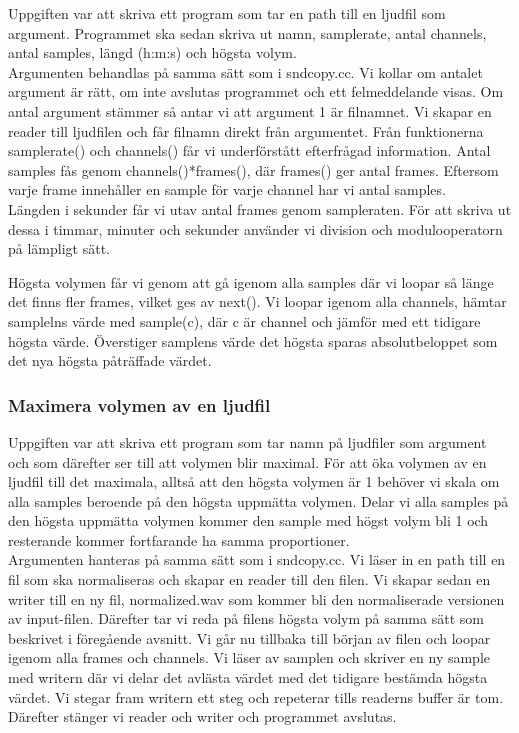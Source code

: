 \documentclass[a4paper, 11pt]{article}
\begin{document}
Uppgiften var att skriva ett program som tar en path till en ljudfil som argument. Programmet ska sedan skriva ut namn, samplerate, antal channels, antal samples, längd (h:m:s) och högsta volym.
\\[\baselineskip]
Argumenten behandlas på samma sätt som i sndcopy.cc. Vi kollar om antalet argument är rätt, om inte avslutas programmet och ett felmeddelande visas. Om antal argument stämmer så antar vi att argument 1 är filnamnet. Vi skapar en reader till ljudfilen och får filnamn direkt från argumentet. Från funktionerna samplerate() och channels() får vi underförstått efterfrågad information. Antal samples fås genom channels()*frames(), där frames() ger antal frames.  Eftersom varje frame innehåller en sample för varje channel har vi antal samples.
\\[\baselineskip]
Längden i sekunder får vi utav antal frames genom sampleraten. För att skriva ut dessa i timmar, minuter och sekunder använder vi division och modulooperatorn på lämpligt sätt.

Högsta volymen får vi genom att gå igenom alla samples där vi loopar så länge det finns fler frames, vilket ges av next(). Vi loopar igenom alla channels, hämtar samplelns värde med sample(c), där c är channel och jämför med ett tidigare högsta värde. Överstiger samplens värde det högsta sparas absolutbeloppet som det nya högsta påträffade värdet.

\subsubsection{Maximera volymen av en ljudfil}

Uppgiften var att skriva ett program som tar namn på ljudfiler som argument och som därefter ser till att volymen blir maximal. För att öka volymen av en ljudfil till det maximala, alltså att den högsta volymen är 1 behöver vi skala om alla samples beroende på den högsta uppmätta volymen. Delar vi alla samples på den högsta uppmätta volymen kommer den sample med högst volym bli 1 och resterande kommer fortfarande ha samma proportioner.
\\[\baselineskip]
Argumenten hanteras på samma sätt som i sndcopy.cc. Vi läser in en path till en fil som ska normaliseras och skapar en reader till den filen. Vi skapar sedan en writer till en ny fil, normalized.wav som kommer bli den normaliserade versionen av input-filen. Därefter tar vi reda på filens högsta volym på samma sätt som beskrivet i föregående avsnitt. Vi går nu tillbaka till början av filen och loopar igenom alla frames och channels. Vi läser av samplen och skriver en ny sample med writern där vi delar det avlästa värdet med det tidigare bestämda högsta värdet. Vi stegar fram writern ett steg och repeterar tills readerns buffer är tom. Därefter stänger vi reader och writer och programmet avslutas.
\end{document}
